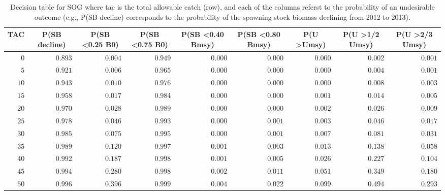 %
\begin{table}[!tbp]
 \caption{Decision table for SOG where tac is the total
			allowable catch (row),  and each of the columns referst to the probability
			of an undesirable outcome (e.g.,  P(SB decline) corresponds to the probability
			of the spawning stock biomass declining from 2012 to 2013).\label{Table:RiskSOG}} 
 \begin{center}
 \begin{tabular}{rrrrrrrrr}\hline\hline
\multicolumn{1}{c}{TAC}&\multicolumn{1}{c}{P(SB decline)}&\multicolumn{1}{c}{P(SB \textless 0.25 B0)}&\multicolumn{1}{c}{P(SB \textless 0.75 B0)}&\multicolumn{1}{c}{P(SB \textless 0.40 Bmsy)}&\multicolumn{1}{c}{P(SB \textless 0.80 Bmsy)}&\multicolumn{1}{c}{P(U \textgreater Umsy)}&\multicolumn{1}{c}{P(U \textgreater 1/2 Umsy)}&\multicolumn{1}{c}{P(U \textgreater 2/3 Umsy)}\tabularnewline
\hline
$ 0$&$0.893$&$0.004$&$0.949$&$0.000$&$0.000$&$0.000$&$0.002$&$0.001$\tabularnewline
$ 5$&$0.921$&$0.006$&$0.965$&$0.000$&$0.000$&$0.000$&$0.004$&$0.001$\tabularnewline
$10$&$0.943$&$0.010$&$0.976$&$0.000$&$0.000$&$0.000$&$0.008$&$0.003$\tabularnewline
$15$&$0.958$&$0.017$&$0.984$&$0.000$&$0.000$&$0.001$&$0.014$&$0.005$\tabularnewline
$20$&$0.970$&$0.028$&$0.989$&$0.000$&$0.000$&$0.002$&$0.026$&$0.009$\tabularnewline
$25$&$0.978$&$0.046$&$0.993$&$0.000$&$0.001$&$0.003$&$0.046$&$0.017$\tabularnewline
$30$&$0.985$&$0.075$&$0.995$&$0.000$&$0.001$&$0.007$&$0.081$&$0.031$\tabularnewline
$35$&$0.989$&$0.120$&$0.997$&$0.001$&$0.003$&$0.013$&$0.138$&$0.058$\tabularnewline
$40$&$0.992$&$0.187$&$0.998$&$0.001$&$0.005$&$0.026$&$0.227$&$0.104$\tabularnewline
$45$&$0.994$&$0.280$&$0.998$&$0.002$&$0.011$&$0.051$&$0.349$&$0.180$\tabularnewline
$50$&$0.996$&$0.396$&$0.999$&$0.004$&$0.022$&$0.099$&$0.494$&$0.293$\tabularnewline
\hline
\end{tabular}

\end{center}

\end{table}


